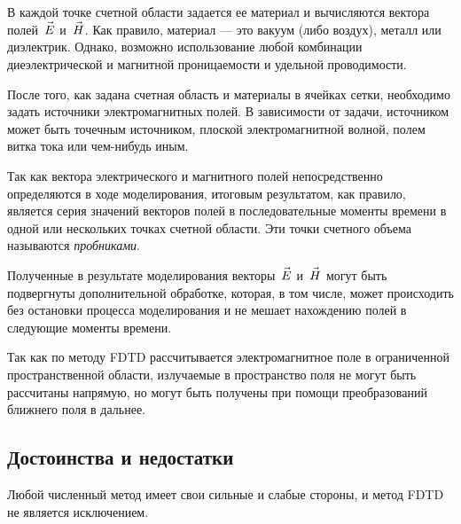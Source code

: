В каждой точке счетной области задается ее материал и вычисляются вектора
полей~$\vec{E\mathstrut}$ и~$\vec{H\mathstrut}$. Как правило, материал --- это вакуум (либо
воздух), металл или диэлектрик. Однако, возможно использование любой комбинации
диеэлектрической и магнитной проницаемости и удельной проводимости.

После того, как задана счетная область и материалы в ячейках сетки, необходимо
задать источники электромагнитных полей. В зависимости от задачи, источником
может быть точечным источником, плоской электромагнитной волной, полем витка
тока или чем-нибудь иным.

Так как вектора электрического и магнитного полей непосредственно определяются
в ходе моделирования, итоговым результатом, как правило, является серия значений
векторов полей в последовательные моменты времени в одной или нескольких точках
счетной области. Эти точки счетного объема называются \emph{пробниками}.

Полученные в результате моделирования векторы~$\vec{E\mathstrut}$ и~$\vec{H\mathstrut}$ могут быть
подвергнуты дополнительной обработке, которая, в том числе, может
происходить без остановки процесса моделирования и не мешает нахождению полей
в следующие моменты времени.

Так как по методу FDTD рассчитывается электромагнитное поле в ограниченной
пространственной области, излучаемые в пространство поля не могут быть рассчитаны
напрямую, но могут быть получены при помощи преобразований ближнего поля в дальнее.

\subsection{Достоинства и недостатки}

Любой численный метод имеет свои сильные и слабые стороны,
и метод FDTD не является исключением.

